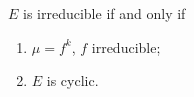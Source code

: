 $E$ is irreducible if and only if
\begin{enumerate}
  \item[(i)] $\mu = f^k$, $f$ irreducible;
  \item[(ii)] $E$ is cyclic.
\end{enumerate}
